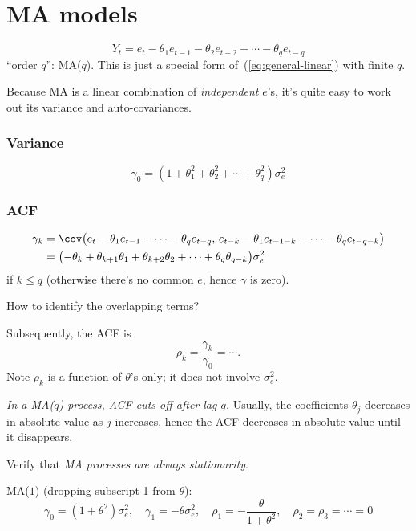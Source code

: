 \documentclass[12pt]{article}
\begin{document}
\section{MA models}

\[
Y_t = e_t - \theta_1 e_{t-1} - \theta_2 e_{t-2}
    - \dotsb - \theta_q e_{t-q}
\]
``order $q$'': MA($q$).
This is just a special form of~(\ref{eq:general-linear}) with finite $q$.

Because MA is a linear combination of \emph{independent} $e$'s,
it's quite easy to work out its variance and auto-covariances.

\subsubsection{Variance}

\[
\gamma_0 = (1 + \theta_1^2 + \theta_2^2 +\dotsb+ \theta_q^2) \sigma^2_e
\]

\subsubsection{ACF}

\[\begin{split}
\gamma_k
&= \cov\bigl(
    e_t - \theta_1 e_{t-1} -\dotsb- \theta_q e_{t-q},\,
    e_{t-k} - \theta_1 e_{t-1-k} -\dotsb- \theta_q e_{t-q-k}
    \bigr)
\\
&= \bigl(
    -\theta_k + \theta_{k+1} \theta_1 + \theta_{k+2} \theta_2
    +\dotsb+ \theta_q \theta_{q-k}
    \bigr)\sigma^2_e
\end{split}
\]
if $k \le q$ (otherwise there's no common $e$, hence $\gamma$ is zero).

\exercise
How to identify the overlapping terms?

Subsequently, the ACF is
\[
\rho_k = \frac{\gamma_k}{\gamma_0} = \dotsb
.
\]
Note $\rho_k$ is a function of $\theta$'s only;
it does not involve $\sigma_e^2$.

\emph{In a MA($q$) process, ACF cuts off after lag $q$.}
Usually, the coefficients
$\theta_j$ decreases in absolute value as $j$ increases,
hence the ACF decreases in absolute value until it disappears.

\alert Verify that \emph{MA processes are always stationarity}.

\example
MA($1$) (dropping subscript 1 from $\theta$):
\[
\gamma_0 = (1 + \theta^2) \sigma^2_e,\quad
\gamma_1 = -\theta \sigma_e^2,\quad
\rho_1 = -\frac{\theta}{1 + \theta^2},\quad
\rho_2 = \rho_3 =\dotsb= 0
\]
\end{document}
